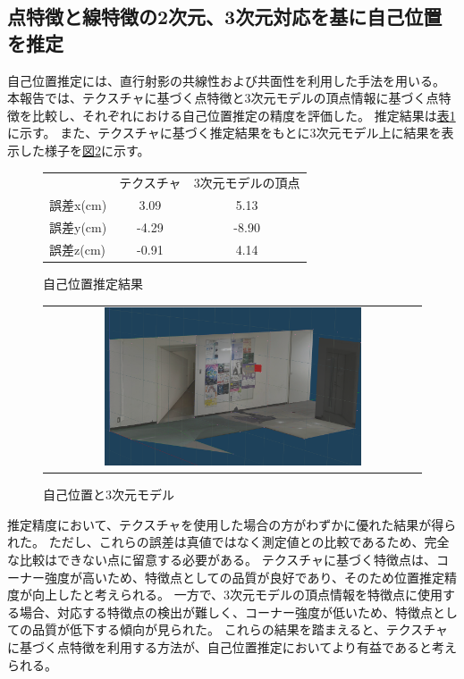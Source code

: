 \documentclass[]{jarticle}          %
\begin{document}
\subsection{点特徴と線特徴の2次元、3次元対応を基に自己位置を推定}
自己位置推定には、直行射影の共線性および共面性を利用した手法\cite{bib_1}を用いる。
本報告では、テクスチャに基づく点特徴と3次元モデルの頂点情報に基づく点特徴を比較し、それぞれにおける自己位置推定の精度を評価した。
推定結果は\hyperref[table1]{表\ref{table1}}に示す。
また、テクスチャに基づく推定結果をもとに3次元モデル上に結果を表示した様子を\hyperref[six]{図\ref{six}}に示す。
\begin{figure}[H]
  \begin{center}
    \begin{tabular}{lcc}
    & テクスチャ & 3次元モデルの頂点 \\
    誤差x(cm) & 3.09 & 5.13 \\
    誤差y(cm) & -4.29 & -8.90 \\
    誤差z(cm) & -0.91 & 4.14
    \end{tabular}
  \end{center}
  \caption{自己位置推定結果}
  \label{table1}
\end{figure}
\begin{figure}[H]
  \begin{center}
    \begin{tabular}{c}
      \includegraphics[width=0.7\textwidth]{figures/poseestimation.png}\\
    \end{tabular}
  \end{center}
  \caption{自己位置と3次元モデル}
  \label{six}
\end{figure}

推定精度において、テクスチャを使用した場合の方がわずかに優れた結果が得られた。
ただし、これらの誤差は真値ではなく測定値との比較であるため、完全な比較はできない点に留意する必要がある。
テクスチャに基づく特徴点は、コーナー強度が高いため、特徴点としての品質が良好であり、そのため位置推定精度が向上したと考えられる。
一方で、3次元モデルの頂点情報を特徴点に使用する場合、対応する特徴点の検出が難しく、コーナー強度が低いため、特徴点としての品質が低下する傾向が見られた。
これらの結果を踏まえると、テクスチャに基づく点特徴を利用する方法が、自己位置推定においてより有益であると考えられる。
\end{document}
